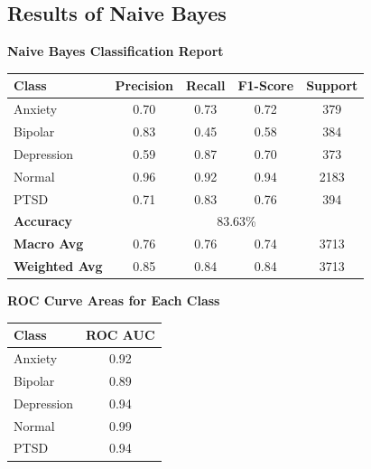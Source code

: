 \pagebreak

\subsection{Results of Naive Bayes}

\begin{center}
    \textbf{Naive Bayes Classification Report} \\[0.5em]
    \begin{tabular}{|l|c|c|c|c|}
        \hline
        \textbf{Class} & \textbf{Precision} & \textbf{Recall} & \textbf{F1-Score} & \textbf{Support} \\ \hline
        Anxiety        & 0.70               & 0.73            & 0.72              & 379              \\ \hline
        Bipolar        & 0.83               & 0.45            & 0.58              & 384              \\ \hline
        Depression     & 0.59               & 0.87            & 0.70              & 373              \\ \hline
        Normal         & 0.96               & 0.92            & 0.94              & 2183             \\ \hline
        PTSD           & 0.71               & 0.83            & 0.76              & 394              \\ \hline
        \textbf{Accuracy} & \multicolumn{4}{|c|}{83.63\%} \\ \hline
        \textbf{Macro Avg} & 0.76            & 0.76            & 0.74              & 3713             \\ \hline
        \textbf{Weighted Avg} & 0.85         & 0.84            & 0.84              & 3713             \\ \hline
    \end{tabular}
\end{center}

\vspace{0.25em}

\begin{center}
    \textbf{ROC Curve Areas for Each Class} \\[0.5em]
    \begin{tabular}{|l|c|}
        \hline
        \textbf{Class}  & \textbf{ROC AUC} \\ \hline
        Anxiety         & 0.92            \\ \hline
        Bipolar         & 0.89            \\ \hline
        Depression      & 0.94            \\ \hline
        Normal          & 0.99            \\ \hline
        PTSD            & 0.94            \\ \hline
    \end{tabular}
\end{center}

